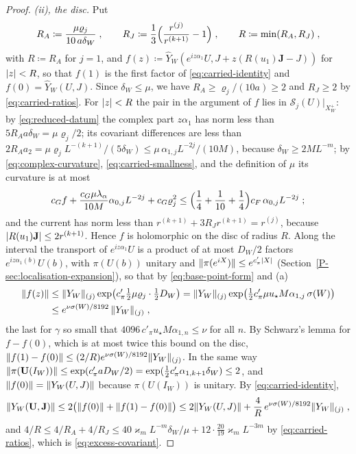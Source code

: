 \begin{proof}
\emph{(ii), the disc.} Put
\[
    R_A \coloneqq \frac{\mu\varrho_j}{10\,a\delta_W}\;,
    \qquad
    R_J \coloneqq \frac13\Bigl(\frac{r^{(j)}}{r^{(k+1)}} - 1\Bigr)\;,
    \qquad
    R \coloneqq \min(R_A, R_J)\;,
\]
with $R \coloneqq R_A$ for $j = 1$, and $f(z) \coloneqq \hat Y_W(e^{iz\alpha_1}U, J + z(R(u_1)\mathbf J - J))$ for $\lvert z\rvert < R$, so that $f(1)$ is the first factor of \eqref{eq:carried-identity} and $f(0) = \hat Y_W(U, J)$. Since $\delta_W \leq \mu$, we have $R_A \geq \varrho_j/(10a) \geq 2$ and $R_J \geq 2$ by \eqref{eq:carried-ratios}. For $\lvert z\rvert < R$ the pair in the argument of $f$ lies in $\mathcal S_j(U)|_{X^+_W}$: by \eqref{eq:reduced-datum} the complex part $z\alpha_1$ has norm less than $5R_Aa\delta_W = \mu\varrho_j/2$; its covariant differences are less than $2R_Aa_2 = \mu\varrho_jL^{-(k+1)}/(5\delta_W) \leq \mu\,\alpha_{1,j}L^{-2j}/(10M)$, because $\delta_W \geq 2ML^{-m}$; by \eqref{eq:complex-curvature}, \eqref{eq:carried-smallness}, and the definition of $\mu$ its curvature is at most
\[
    c_Gf + \frac{c_G\mu\lambda_\alpha}{10M}\alpha_{0,j}L^{-2j} + c_G\varrho_j^2 \leq \Bigl(\frac14 + \frac{1}{10} + \frac14\Bigr)c_F\,\alpha_{0,j}L^{-2j}\;;
\]
and the current has norm less than $r^{(k+1)} + 3R_Jr^{(k+1)} = r^{(j)}$, because $\lvert R(u_1)\mathbf J\rvert \leq 2r^{(k+1)}$. Hence $f$ is holomorphic on the disc of radius $R$. Along the interval the transport of $e^{iz\alpha_1}U$ is a product of at most $D_W/2$ factors $e^{iz\alpha_1(b)}U(b)$, with $\pi(U(b))$ unitary and $\lVert\pi(e^{iX})\rVert \leq e^{c'_\pi\lvert X\rvert}$ (Section~\ref{P-sec:localisation-expansion}), so that by \eqref{eq:base-point-form} and (a)
\begin{align*}
    \lVert f(z)\rVert &\leq \lVert Y_W\rVert_{(j)}\exp\bigl(c'_\pi\tfrac12\mu\varrho_j \cdot \tfrac12D_W\bigr) = \lVert Y_W\rVert_{(j)}\exp\bigl(\tfrac12c'_\pi\mu u_\star M\alpha_{1,j}\,\sigma(W)\bigr)\\
    &\leq e^{\nu\sigma(W)/8192}\,\lVert Y_W\rVert_{(j)}\;,
\end{align*}
the last for $\gamma$ so small that $4096\,c'_\pi u_\star M\alpha_{1,n} \leq \nu$ for all $n$. By Schwarz's lemma for $f - f(0)$, which is at most twice this bound on the disc, $\lVert f(1) - f(0)\rVert \leq (2/R)e^{\nu\sigma(W)/8192}\lVert Y_W\rVert_{(j)}$. In the same way $\lVert\pi(\mathbf U(I_W))\rVert \leq \exp(c'_\pi a D_W/2) = \exp(\frac12c'_\pi\alpha_{1,k+1}\delta_W) \leq 2$, and $\lVert f(0)\rVert = \lVert Y_W(U, J)\rVert$ because $\pi(U(I_W))$ is unitary. By \eqref{eq:carried-identity},
\[
    \lVert Y_W(\mathbf U, \mathbf J)\rVert \leq 2\bigl(\lVert f(0)\rVert + \lVert f(1) - f(0)\rVert\bigr) \leq 2\lVert Y_W(U, J)\rVert + \frac4R\,e^{\nu\sigma(W)/8192}\lVert Y_W\rVert_{(j)}\;,
\]
and $4/R \leq 4/R_A + 4/R_J \leq 40\varkappa_mL^{-m}\delta_W/\mu + 12 \cdot \frac{20}{19}\varkappa_mL^{-3m}$ by \eqref{eq:carried-ratios}, which is \eqref{eq:excess-covariant}.
\end{proof}

